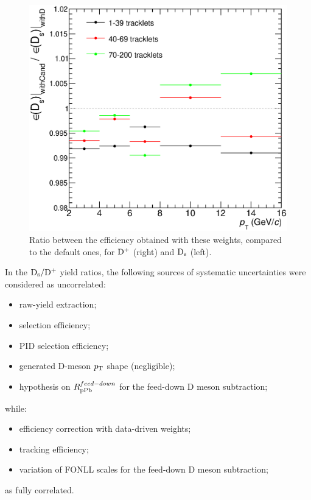 \begin{figure}[htpb]
\centering
 \includegraphics[width=.49\textwidth]{FigCap6/SystOnDWeightsWithCandVsWithD_Dsonly.eps}
 \caption{Ratio between the efficiency obtained with these weights, compared to the default ones, for ${\rm D^+}$ (right) and ${\rm D_s}$ (left).}
 \label{fig:DsDplusVsMult_SystEffWeights}
\end{figure}


In the ${\rm D_s}/{\rm D^+}$ yield ratios, the following sources of systematic 
uncertainties were considered as uncorrelated:
\begin{itemize}
\item raw-yield extraction;
\item selection efficiency;
\item PID selection efficiency;
\item generated D-meson $p_{\rm T}$ shape (negligible);
\item hypothesis on $R_{\rm pPb}^{feed-down}$ for the feed-down D meson subtraction;
\end{itemize}
while:
\begin{itemize}
\item efficiency correction with data-driven weights;
\item tracking efficiency;
\item variation of FONLL scales for the feed-down D meson subtraction;
\end{itemize} 
as fully correlated.


